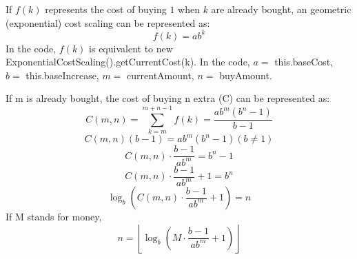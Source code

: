 \documentclass[11pt, oneside]{article}   	%
\title{}
\author{}
\date{2026/03/03}							%
\begin{document}
\maketitle
If $f(k)$ represents the cost of buying $1$ when $k$ are already bought, an geometric (exponential) cost scaling can be represented as:
\[
f(k) = ab^k
\]
In the code, $f(k)$ is equivalent to new ExponentialCostScaling().getCurrentCost(k).
In the code, $a=$ this.baseCost, $b=$ this.baseIncrease, $m=$ currentAmount, $n=$ buyAmount.

If m is already bought, the cost of buying n extra (C) can be represented as:
\[
C(m,n)=\sum_{k=m}^{m+n-1}f(k)
=\dfrac{ab^m(b^n-1)}{b-1}
\]
\[C(m,n)(b-1)=ab^m(b^n-1)  (b\ne1)\]
\[C(m,n)\cdot\frac{b-1}{ab^m}=b^n-1\]
\[C(m,n)\cdot\frac{b-1}{ab^m}+1=b^n\]
\[\log_b
\left( C(m,n)\cdot\frac{b-1}{ab^m}+1 \right)
=n\]
If M stands for money,
\[n=\left\lfloor
\log_b\left( M \cdot \frac{b-1}{ab^m}+1 \right)
\right\rfloor\]

\end{document}
